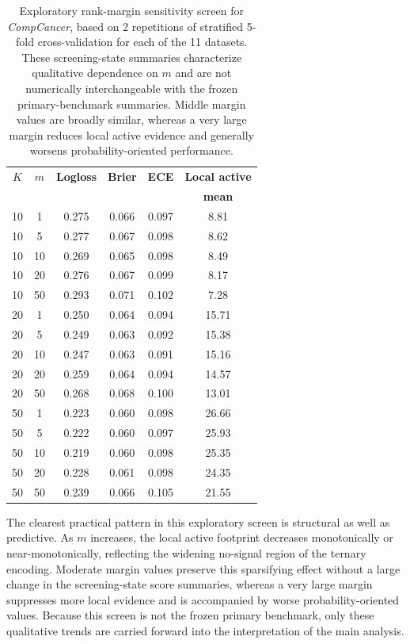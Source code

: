\documentclass[11pt, a4paper]{article}
\newcommand{\stdtablefont}{\small}
\newcommand{\stdtablelayout}{%
  \stdtablefont
  \setlength{\tabcolsep}{4pt}
  \renewcommand{\arraystretch}{1.2}
}
\begin{document}
\begin{table}[!htbp]
\centering
\caption{Exploratory rank-margin sensitivity screen for \emph{CompCancer}, based on 2 repetitions of stratified 5-fold cross-validation for each of the 11 datasets. These screening-state summaries characterize qualitative dependence on $m$ and are not numerically interchangeable with the frozen primary-benchmark summaries. Middle margin values are broadly similar, whereas a very large margin reduces local active evidence and generally worsens probability-oriented performance.}
\label{tab:m_sensitivity_world}
{\stdtablelayout
\begin{tabular}{cccccc}
\toprule
\textbf{$K$} & \textbf{$m$} & \textbf{Logloss} & \textbf{Brier} & \textbf{ECE} & \textbf{Local active} \\
 & & & & & \textbf{mean} \\
\midrule
10 & 1  & 0.275 & 0.066 & 0.097 & 8.81 \\
10 & 5  & 0.277 & 0.067 & 0.098 & 8.62 \\
10 & 10 & 0.269 & 0.065 & 0.098 & 8.49 \\
10 & 20 & 0.276 & 0.067 & 0.099 & 8.17 \\
10 & 50 & 0.293 & 0.071 & 0.102 & 7.28 \\
\midrule
20 & 1  & 0.250 & 0.064 & 0.094 & 15.71 \\
20 & 5  & 0.249 & 0.063 & 0.092 & 15.38 \\
20 & 10 & 0.247 & 0.063 & 0.091 & 15.16 \\
20 & 20 & 0.259 & 0.064 & 0.094 & 14.57 \\
20 & 50 & 0.268 & 0.068 & 0.100 & 13.01 \\
\midrule
50 & 1  & 0.223 & 0.060 & 0.098 & 26.66 \\
50 & 5  & 0.222 & 0.060 & 0.097 & 25.93 \\
50 & 10 & 0.219 & 0.060 & 0.098 & 25.35 \\
50 & 20 & 0.228 & 0.061 & 0.098 & 24.35 \\
50 & 50 & 0.239 & 0.066 & 0.105 & 21.55 \\
\bottomrule
\end{tabular}
}
\end{table}

The clearest practical pattern in this exploratory screen is structural as well as predictive. As $m$ increases, the local active footprint decreases monotonically or near-monotonically, reflecting the widening no-signal region of the ternary encoding. Moderate margin values preserve this sparsifying effect without a large change in the screening-state score summaries, whereas a very large margin suppresses more local evidence and is accompanied by worse probability-oriented values. Because this screen is not the frozen primary benchmark, only these qualitative trends are carried forward into the interpretation of the main analysis.
\end{document}
